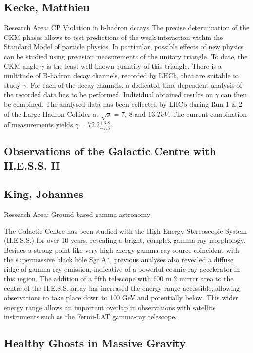 \subsection*{\centering \normalsize Kecke, Matthieu}
Research Area: CP Violation in b-hadron decays\newline
\noindent The precise determination of the CKM phases allows to test predictions of the weak interaction within the Standard Model of particle physics. In particular, possible effects of new physics can be studied using precision measurements of the unitary triangle. To date, the CKM angle $\gamma$ is the least well known quantity of this triangle. \newline
There is a multitude of B-hadron decay channels, recorded by LHCb, that are suitable to study $\gamma$. For each of the decay channels, a dedicated time-dependent analysis of the recorded data has to be performed. Individual obtained results on $\gamma$ can then be combined.
The analysed data has been collected by LHCb during Run 1 \& 2 of the Large Hadron Collider at $\sqrt{s}$ = 7, 8 and 13 $TeV$. The current combination of measurements yields $\gamma = 72.2^{+6.8}_{-7.3}$.

\subsection*{\centering \large Observations of the Galactic Centre with H.E.S.S. II}
\subsection*{\centering \normalsize King, Johannes}
Research Area:  Ground based gamma astronomy\newline

\noindent The Galactic Centre has been studied with the High Energy Stereoscopic System (H.E.S.S.) for over 10 years, revealing a bright, complex gamma-ray morphology. Besides a strong point-like very-high-energy gamma-ray source coincident with the supermassive black hole Sgr A*, previous analyses also revealed a diffuse ridge of gamma-ray emission, indicative of a powerful cosmic-ray accelerator in this region. The addition of a fifth telescope with 600 m 2 mirror area to the centre of the H.E.S.S. array has increased the energy range accessible, allowing observations to take place down to 100 GeV and potentially below. This wider energy range allows an important overlap in observations with satellite instruments such as the Fermi-LAT gamma-ray telescope.
\newpage
\subsection*{\centering \large Healthy Ghosts in Massive Gravity }
